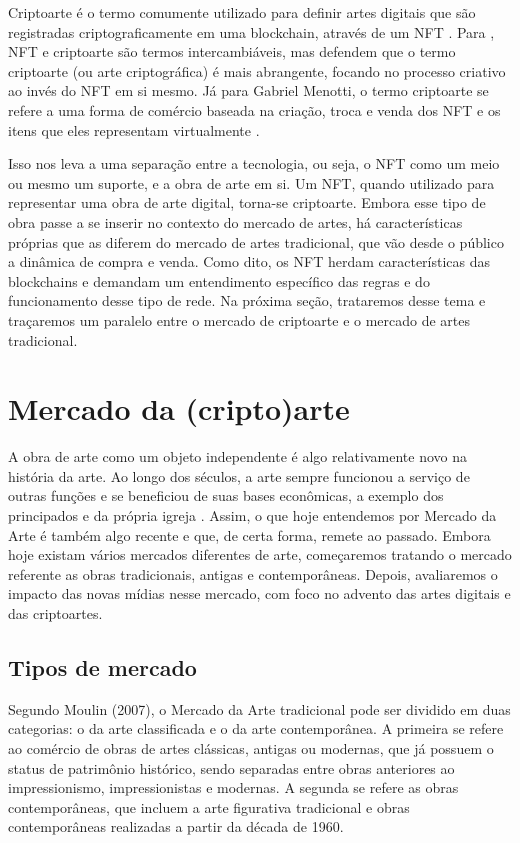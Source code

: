 Criptoarte é o termo comumente utilizado para definir artes digitais que são registradas criptograficamente em uma blockchain, através de um NFT \cite{Rkain, Jung}. Para , NFT e criptoarte são termos intercambiáveis, mas defendem que o termo criptoarte (ou arte criptográfica) é mais abrangente, focando no processo criativo ao invés do NFT em si mesmo. Já para Gabriel Menotti, o termo criptoarte se refere a uma forma de comércio baseada na criação, troca e venda dos NFT e os itens que eles representam virtualmente \cite{Menotti}.	

Isso nos leva a uma separação entre a tecnologia, ou seja, o NFT como um meio ou mesmo um suporte, e a obra de arte em si. Um NFT, quando utilizado para representar uma obra de arte digital, torna-se criptoarte. Embora esse tipo de obra passe a se inserir no contexto do mercado de artes, há características próprias que as diferem do mercado de artes tradicional, que vão desde o público a dinâmica de compra e venda. Como dito, os NFT herdam características das blockchains e demandam um entendimento específico das regras e do funcionamento desse tipo de rede. Na próxima seção, trataremos desse tema e traçaremos um paralelo entre o mercado de criptoarte e o mercado de artes tradicional.


\section{Mercado da (cripto)arte}
\label{sec:mercado de arte}

A obra de arte como um objeto independente é algo relativamente novo na história da arte. Ao longo dos séculos, a arte sempre funcionou a serviço de outras funções e se beneficiou de suas bases econômicas, a exemplo dos principados e da própria igreja \cite{Greffe}. Assim, o que hoje entendemos por Mercado da Arte é também algo recente e que, de certa forma, remete ao passado. Embora hoje existam vários mercados diferentes de arte, começaremos tratando o mercado referente as obras tradicionais, antigas e contemporâneas. Depois, avaliaremos o impacto das novas mídias nesse mercado, com foco no advento das artes digitais e das criptoartes.

\subsection{Tipos de mercado}
\label{subsec: tipos de mercado}

Segundo Moulin (2007),  o Mercado da Arte tradicional pode ser dividido em duas categorias: o da arte classificada e o da arte contemporânea. A primeira se refere ao comércio de obras de artes clássicas, antigas ou modernas, que já possuem o status de patrimônio histórico, sendo separadas entre obras anteriores ao impressionismo, impressionistas e modernas. A segunda se refere as obras contemporâneas, que incluem a arte figurativa tradicional e obras contemporâneas realizadas a partir da década de 1960. 

